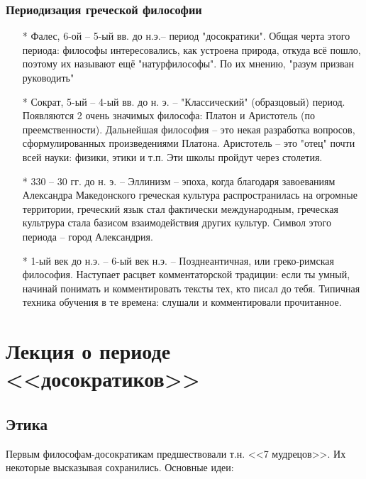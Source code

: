 \documentclass[a4paper, 12pt]{book} %
\begin{document}
\subsubsection{Периодизация греческой философии}
\begin{itemize}
\item[*] Фалес, 6-ой -- 5-ый вв. до н.э.-- период "досократики". Общая черта этого периода: философы интересовались, как устроена природа, откуда всё пошло, поэтому их называют ещё "натурфилософы". По их мнению, "разум призван руководить"

\item[*] Сократ, 5-ый -- 4-ый вв. до н. э.  -- "Классический" (образцовый) период. Появляются 2 очень значимых философа: Платон и Аристотель (по преемственности). Дальнейшая философия -- это некая разработка вопросов, сформулированных произведениями Платона. Аристотель -- это "отец" почти всей науки: физики, этики и т.п. Эти школы пройдут через столетия.

\item[*] 330 -- 30 гг. до н. э. -- Эллинизм -- эпоха, когда благодаря завоеваниям Александра Македонского греческая культура распространилась на огромные территории, греческий язык стал фактически международным, греческая культрура стала базисом взаимодействия других культур. Символ этого периода -- город Александрия.

\item[*] 1-ый век до н.э. -- 6-ый век н.э. -- Позднеантичная, или греко-римская философия. Наступает расцвет комментаторской традиции: если ты умный, начинай понимать и комментировать тексты тех, кто писал до тебя. Типичная техника обучения в те времена: слушали и комментировали прочитанное. 
\end{itemize}
 
\section{Лекция о периоде <<досократиков>>}

\subsection{Этика}
Первым философам-досократикам предшествовали т.н. <<7 мудрецов>>. Их некоторые высказывая сохранились. Основные идеи:
\end{document}
